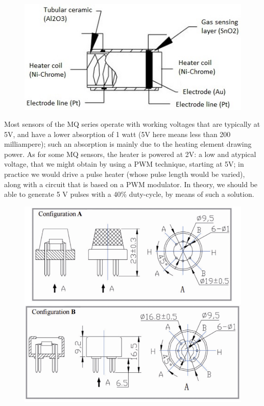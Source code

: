 \documentclass{article}\usepackage[]{graphicx}\usepackage[]{color}
\begin{document}
\begin{figure}
\includegraphics[width=1.0\textwidth]{Sensing-Element-in-Gas-Sensor.jpg}
\end{figure}

Most sensors of the MQ series operate with working voltages that are typically at 5V, and have a lower absorption of 1 watt (5V here means less than 200 milliampere); such an absorption is mainly due to the heating element drawing power. As for some MQ sensors, the heater is powered at 2V: a low and atypical voltage, that we might obtain by using a PWM technique, starting at 5V; in practice we would drive a pulse heater (whose pulse length would be varied), along with a circuit that is based on a PWM modulator. In theory, we should be able to generate 5 V pulses with a 40\% duty-cycle, by means of such a solution.

\begin{figure}
\includegraphics[width=1.0\textwidth]{MQ-X.png}
\end{figure}
\end{document}
